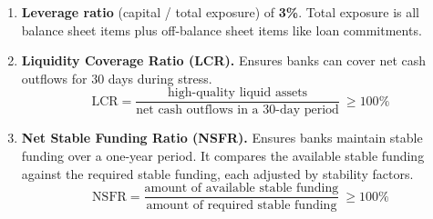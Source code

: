 \begin{enumerate}
\item[\textcolor{rust}{\sffamily\bfseries 1)}] \textbf{Leverage ratio} (capital /
total exposure) of \textbf{3\%}. Total exposure is all balance sheet items plus
off-balance sheet items like loan commitments.
\item[\textcolor{rust}{\sffamily\bfseries 2)}] \textbf{Liquidity Coverage Ratio
(LCR).} Ensures banks can cover net cash outflows for 30 days during stress.
\[
\mathrm{LCR}=\frac{\text{high-quality liquid assets}}
                  {\text{net cash outflows in a 30-day period}}\ \geq 100\%
\]
\item[\textcolor{rust}{\sffamily\bfseries 3)}] \textbf{Net Stable Funding Ratio
(NSFR).} Ensures banks maintain stable funding over a one-year period. It compares
the available stable funding against the required stable funding, each adjusted by
stability factors.
\[
\mathrm{NSFR}=\frac{\text{amount of available stable funding}}
                   {\text{amount of required stable funding}}\ \geq 100\%
\]
\end{enumerate}

